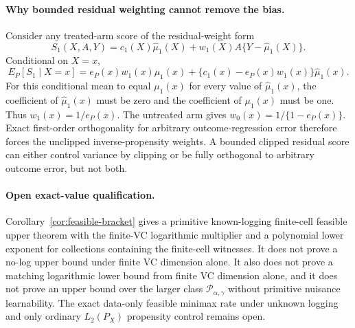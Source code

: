 \documentclass[11pt]{article}
\theoremstyle{definition}
\theoremstyle{plain}
\theoremstyle{remark}
\begin{document}
\paragraph{Why bounded residual weighting cannot remove the bias.}
Consider any treated-arm score of the residual-weight form
\[
S_1(X,A,Y)=c_1(X)\widehat\mu_1(X)+w_1(X)A\{Y-\widehat\mu_1(X)\}.
\]
Conditional on \(X=x\),
\[
E_P[S_1\mid X=x]
=e_P(x)w_1(x)\mu_1(x)
+\{c_1(x)-e_P(x)w_1(x)\}\widehat\mu_1(x).
\]
For this conditional mean to equal \(\mu_1(x)\) for every value of
\(\widehat\mu_1(x)\), the coefficient of \(\widehat\mu_1(x)\) must be zero
and the coefficient of \(\mu_1(x)\) must be one.  Thus
\(w_1(x)=1/e_P(x)\).  The untreated arm gives
\(w_0(x)=1/\{1-e_P(x)\}\).  Exact first-order orthogonality for arbitrary
outcome-regression error therefore forces the unclipped inverse-propensity
weights.  A bounded clipped residual score can either control variance by
clipping or be fully orthogonal to arbitrary outcome error, but not both.

\paragraph{Open exact-value qualification.}
Corollary~\ref{cor:feasible-bracket} gives a primitive known-logging
finite-cell feasible upper theorem with the finite-VC logarithmic multiplier
and a polynomial lower exponent for collections containing the finite-cell
witnesses.  It does not prove a no-log upper bound under finite VC dimension
alone.  It also does not prove a matching logarithmic lower bound from finite
VC dimension alone, and it does not prove an upper bound over the larger
class \(\mathcal P_{\alpha,\gamma}\) without primitive nuisance learnability.
The exact data-only feasible minimax rate under unknown logging and only
ordinary \(L_2(P_X)\) propensity control remains open.
\end{document}
